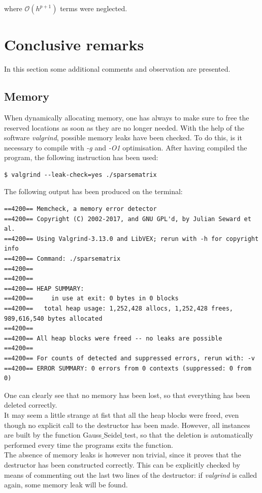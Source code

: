 \documentclass[11pt]{article}
\theoremstyle{theorem}
\theoremstyle{definition}
\begin{document}
where $\mathcal{O}(h^{p+1})$ terms were neglected.\\
\section{Conclusive remarks}
In this section some additional comments and observation are presented.

\subsection{Memory}
When dynamically allocating memory, one has always to make sure to free the reserved locations as soon as they are no longer needed. With the help of the software \emph{valgrind}, possible memory leaks have been checked. To do this, is it necessary to compile with \emph{-g} and \emph{-O1} optimisation. After having compiled the program, the following instruction has been used:

\begin{verbatim}
$ valgrind --leak-check=yes ./sparsematrix
\end{verbatim}

The following output has been produced on the terminal:

\begin{verbatim}
==4200== Memcheck, a memory error detector
==4200== Copyright (C) 2002-2017, and GNU GPL'd, by Julian Seward et al.
==4200== Using Valgrind-3.13.0 and LibVEX; rerun with -h for copyright info
==4200== Command: ./sparsematrix
==4200== 
==4200== 
==4200== HEAP SUMMARY:
==4200==     in use at exit: 0 bytes in 0 blocks
==4200==   total heap usage: 1,252,428 allocs, 1,252,428 frees, 989,616,540 bytes allocated
==4200== 
==4200== All heap blocks were freed -- no leaks are possible
==4200== 
==4200== For counts of detected and suppressed errors, rerun with: -v
==4200== ERROR SUMMARY: 0 errors from 0 contexts (suppressed: 0 from 0)
\end{verbatim}

One can clearly see that no memory has been lost, so that everything has been deleted correctly. \\
It may seem a little strange at fist that all the heap blocks were freed, even though no explicit call to the destructor has been made. However, all instances are built by the function Gauss$\_$Seidel$\_$test, so that the deletion is automatically performed every time the programs exits the function.\\
The absence of memory leaks is however non trivial, since it proves that the destructor has been constructed correctly. This can be explicitly checked by means of commenting out the last two lines of the destructor: if \emph{valgrind} is called again, some memory leak will be found.\\ 
\end{document}
